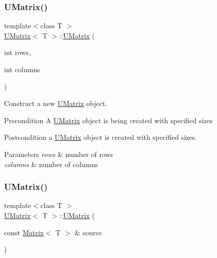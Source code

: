 \subsubsection{\texorpdfstring{UMatrix()}{UMatrix()}\hspace{0.1cm}{\footnotesize\ttfamily [2/5]}}
{\footnotesize\ttfamily template$<$class T $>$ \\
\mbox{\hyperlink{class_u_matrix}{U\+Matrix}}$<$ T $>$\+::\mbox{\hyperlink{class_u_matrix}{U\+Matrix}} (\begin{DoxyParamCaption}\item[{int}]{rows,  }\item[{int}]{columns }\end{DoxyParamCaption})}



Construct a new \mbox{\hyperlink{class_u_matrix}{U\+Matrix}} object. 

\begin{DoxyPrecond}{Precondition}
A \mbox{\hyperlink{class_u_matrix}{U\+Matrix}} object is being created with specified sizes 
\end{DoxyPrecond}
\begin{DoxyPostcond}{Postcondition}
a \mbox{\hyperlink{class_u_matrix}{U\+Matrix}} object is created with specified sizes.
\end{DoxyPostcond}

\begin{DoxyParams}{Parameters}
{\em rows} & number of rows \\
\hline
{\em columns} & number of columns \\
\hline
\end{DoxyParams}
\mbox{\label{class_u_matrix_a784cebb7d674ada97720bcb34f49ca6b}} 
\subsubsection{\texorpdfstring{UMatrix()}{UMatrix()}\hspace{0.1cm}{\footnotesize\ttfamily [3/5]}}
{\footnotesize\ttfamily template$<$class T $>$ \\
\mbox{\hyperlink{class_u_matrix}{U\+Matrix}}$<$ T $>$\+::\mbox{\hyperlink{class_u_matrix}{U\+Matrix}} (\begin{DoxyParamCaption}\item[{const \mbox{\hyperlink{class_matrix}{Matrix}}$<$ T $>$ \&}]{source }\end{DoxyParamCaption})}



